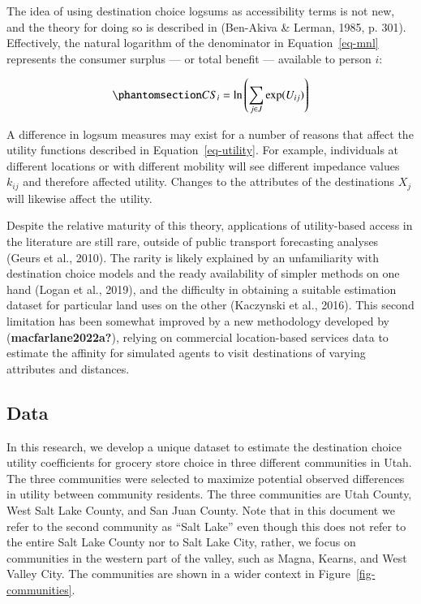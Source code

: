 \documentclass[
  letterpaper,
  number,
  review,
  doubleblind,
  3p]{elsarticle}
\begin{document}
The idea of using destination choice logsums as accessibility terms is
not new, and the theory for doing so is described in (Ben-Akiva \&
Lerman, 1985, p. 301). Effectively, the natural logarithm of the
denominator in Equation~\ref{eq-mnl} represents the consumer surplus ---
or total benefit --- available to person \(i\):

\begin{equation}\phantomsection\label{eq-cs}{ CS_i = \ln\left(\sum_{j \in J} \exp(U_{ij})\right)}\end{equation}

A difference in logsum measures may exist for a number of reasons that
affect the utility functions described in Equation~\ref{eq-utility}. For
example, individuals at different locations or with different mobility
will see different impedance values \(k_{ij}\) and therefore affected
utility. Changes to the attributes of the destinations \(X_j\) will
likewise affect the utility.

Despite the relative maturity of this theory, applications of
utility-based access in the literature are still rare, outside of public
transport forecasting analyses (Geurs et al., 2010). The rarity is
likely explained by an unfamiliarity with destination choice models and
the ready availability of simpler methods on one hand (Logan et al.,
2019), and the difficulty in obtaining a suitable estimation dataset for
particular land uses on the other (Kaczynski et al., 2016). This second
limitation has been somewhat improved by a new methodology developed by
(\textbf{macfarlane2022a?}), relying on commercial location-based
services data to estimate the affinity for simulated agents to visit
destinations of varying attributes and distances.

\subsection{Data}\label{data}

In this research, we develop a unique dataset to estimate the
destination choice utility coefficients for grocery store choice in
three different communities in Utah. The three communities were selected
to maximize potential observed differences in utility between community
residents. The three communities are Utah County, West Salt Lake County,
and San Juan County. Note that in this document we refer to the second
community as ``Salt Lake'' even though this does not refer to the entire
Salt Lake County nor to Salt Lake City, rather, we focus on communities
in the western part of the valley, such as Magna, Kearns, and West
Valley City. The communities are shown in a wider context in
Figure~\ref{fig-communities}.
\end{document}
